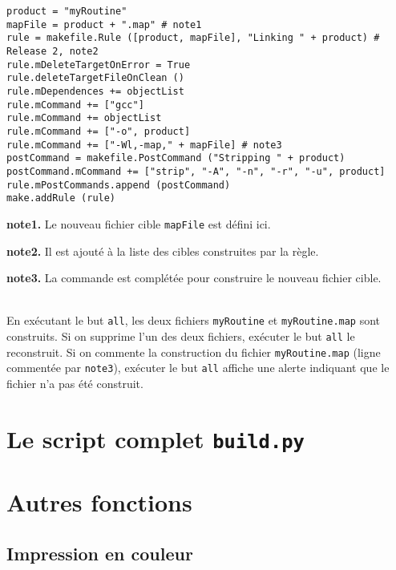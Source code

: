\documentclass[a4paper,11pt]{extarticle}
\begin{document}
\begin{lstlisting}[language=Py]
product = "myRoutine"
mapFile = product + ".map" # note1
rule = makefile.Rule ([product, mapFile], "Linking " + product) # Release 2, note2
rule.mDeleteTargetOnError = True
rule.deleteTargetFileOnClean ()
rule.mDependences += objectList
rule.mCommand += ["gcc"]
rule.mCommand += objectList
rule.mCommand += ["-o", product]
rule.mCommand += ["-Wl,-map," + mapFile] # note3
postCommand = makefile.PostCommand ("Stripping " + product)
postCommand.mCommand += ["strip", "-A", "-n", "-r", "-u", product]
rule.mPostCommands.append (postCommand)
make.addRule (rule)
\end{lstlisting}

{\bf note1.} Le nouveau fichier cible \texttt{mapFile} est défini ici.

{\bf note2.} Il est ajouté à la liste des cibles construites par la règle.

{\bf note3.} La commande est complétée pour construire le nouveau fichier cible.
\\~

En exécutant le but \texttt{all}, les deux fichiers \texttt{myRoutine} et \texttt{myRoutine.map} sont construits. Si on supprime l'un des deux fichiers, exécuter le but \texttt{all} le reconstruit. Si on commente la construction du fichier \texttt{myRoutine.map} (ligne commentée par \texttt{note3}), exécuter le but \texttt{all} affiche une alerte indiquant que le fichier n'a pas été construit.












\section{Le script complet \texttt{build.py}}












\section{Autres fonctions}

\subsection{Impression en couleur}
\end{document}
